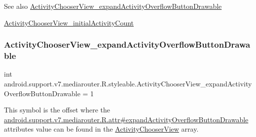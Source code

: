 \begin{DoxySeeAlso}{See also}
\hyperlink{classandroid_1_1support_1_1v7_1_1mediarouter_1_1R_1_1styleable_a457330a114518bf1b63afb5c8d5d4ba4}{Activity\+Chooser\+View\+\_\+expand\+Activity\+Overflow\+Button\+Drawable} 

\hyperlink{classandroid_1_1support_1_1v7_1_1mediarouter_1_1R_1_1styleable_a85994d46283b79caf8459fb6bee0dc0e}{Activity\+Chooser\+View\+\_\+initial\+Activity\+Count} 
\end{DoxySeeAlso}
\mbox{\label{classandroid_1_1support_1_1v7_1_1mediarouter_1_1R_1_1styleable_a457330a114518bf1b63afb5c8d5d4ba4}} 
\subsubsection{\texorpdfstring{Activity\+Chooser\+View\+\_\+expand\+Activity\+Overflow\+Button\+Drawable}{ActivityChooserView\_expandActivityOverflowButtonDrawable}}
{\footnotesize\ttfamily int android.\+support.\+v7.\+mediarouter.\+R.\+styleable.\+Activity\+Chooser\+View\+\_\+expand\+Activity\+Overflow\+Button\+Drawable = 1\hspace{0.3cm}{\ttfamily [static]}}

This symbol is the offset where the \hyperlink{classandroid_1_1support_1_1v7_1_1mediarouter_1_1R_1_1attr_ad172cad171d05a0da03a6b639907da78}{android.\+support.\+v7.\+mediarouter.\+R.\+attr\#expand\+Activity\+Overflow\+Button\+Drawable} attribute\textquotesingle{}s value can be found in the \hyperlink{classandroid_1_1support_1_1v7_1_1mediarouter_1_1R_1_1styleable_a053ff33215816ca018afd657dbf094a2}{Activity\+Chooser\+View} array.

